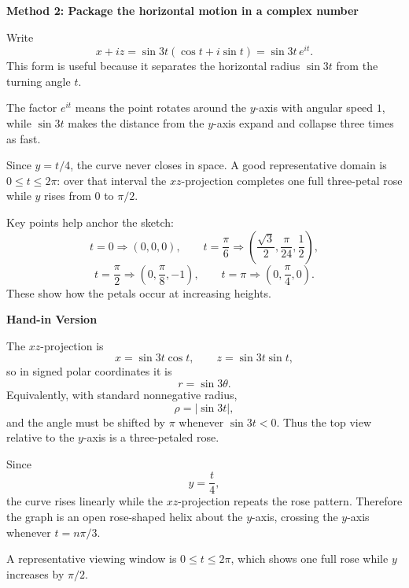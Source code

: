 \documentclass[a4paper,12pt,twocolumn]{article}
\newenvironment{solutionbox}{\begin{framed}}{\end{framed}}
\begin{document}
\begin{solutionbox}
\textbf{Method 2: Package the horizontal motion in a complex number}

\begin{steps}
\item Write
\[
x+iz=\sin 3t(\cos t+i\sin t)=\sin 3t\,e^{it}.
\]
This form is useful because it separates the horizontal radius \(\sin 3t\) from the turning angle \(t\).

\item The factor \(e^{it}\) means the point rotates around the \(y\)-axis with angular speed \(1\), while \(\sin 3t\) makes the distance from the \(y\)-axis expand and collapse three times as fast.

\item Since \(y=t/4\), the curve never closes in space. A good representative domain is \(0\le t\le 2\pi\): over that interval the \(xz\)-projection completes one full three-petal rose while \(y\) rises from \(0\) to \(\pi/2\).

\item Key points help anchor the sketch:
\[
t=0\Rightarrow (0,0,0),\qquad
t=\frac{\pi}{6}\Rightarrow \left(\frac{\sqrt3}{2},\frac{\pi}{24},\frac12\right),
\]
\[
t=\frac{\pi}{2}\Rightarrow \left(0,\frac{\pi}{8},-1\right),\qquad
t=\pi\Rightarrow \left(0,\frac{\pi}{4},0\right).
\]
These show how the petals occur at increasing heights.
\end{steps}
\end{solutionbox}

\begin{solutionbox}
\textbf{Hand-in Version}

The \(xz\)-projection is
\[
x=\sin 3t\cos t,\qquad z=\sin 3t\sin t,
\]
so in signed polar coordinates it is
\[
\boxed{r=\sin 3\theta.}
\]
Equivalently, with standard nonnegative radius,
\[
\rho=|\sin 3t|,
\]
and the angle must be shifted by \(\pi\) whenever \(\sin 3t<0\). Thus the top view relative to the \(y\)-axis is a three-petaled rose.

Since
\[
y=\frac{t}{4},
\]
the curve rises linearly while the \(xz\)-projection repeats the rose pattern. Therefore the graph is an open rose-shaped helix about the \(y\)-axis, crossing the \(y\)-axis whenever \(t=n\pi/3\).

A representative viewing window is \(0\le t\le 2\pi\), which shows one full rose while \(y\) increases by \(\pi/2\).

\begin{center}
\end{center}
\end{solutionbox}
\end{document}
